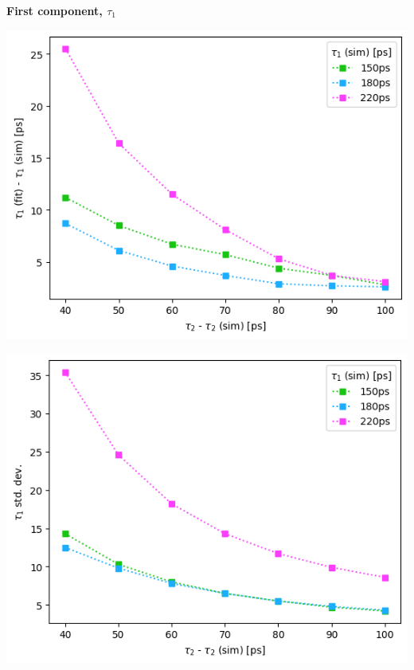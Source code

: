 {\centering \textbf{First component, $\tau_1$}

\begin{minipage}{.47\linewidth}
     
    \includegraphics[width=\linewidth]{Batch 3/regular IRF/t1-diff 2080.png}
    \label{fig:comp-t1-2080}
\end{minipage}
\hfill
\begin{minipage}{.47\linewidth}
     
    \includegraphics[width=\linewidth]{Batch 3/regular IRF/t1-err 2080.png}
    \label{fig:comp-t1err-2080}
\end{minipage}
\begin{minipage}{.47\linewidth}
     

\end{minipage}}
